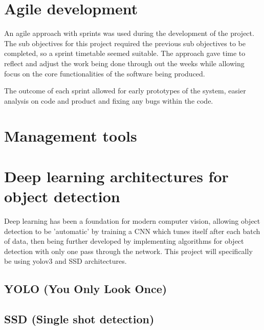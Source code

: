 \documentclass[12pt]{report}
\begin{document}
\section{Agile development}

An agile approach with sprints was used during the development of the project. The sub objectives for this project required the previous sub objectives to be completed, so a sprint timetable seemed suitable. The approach gave time to reflect and adjust the work being done through out the weeks while allowing focus on the core functionalities of the software being produced. 

The outcome of each sprint allowed for early prototypes of the system, easier analysis on code and product and fixing any bugs within the code.

\section{Management tools}

\section{Deep learning architectures for object detection}

Deep learning has been a foundation for modern computer vision, allowing object detection to be 'automatic' by training a CNN which tunes itself after each batch of data, then being further developed by implementing algorithms for object detection with only one pass through the network. This project will specifically be using yolov3 and SSD architectures.

\subsection{YOLO (You Only Look Once)}

\subsection{SSD (Single shot detection)}
\end{document}
